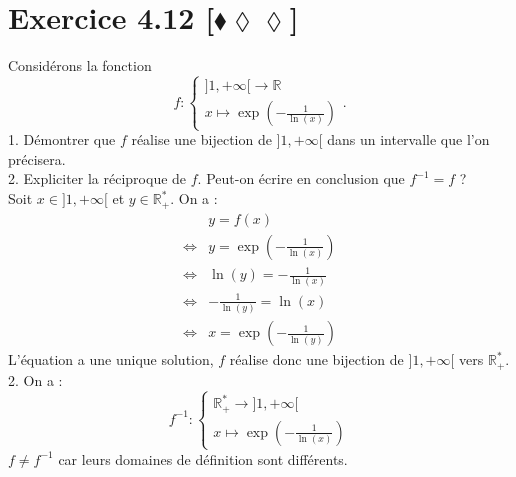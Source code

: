 \documentclass[10pt]{article}
\begin{document}
\section*{Exercice 4.12 [$\blacklozenge\lozenge\lozenge$]}
\begin{tcolorbox}[enhanced, width=7in, center, size=fbox, fontupper=\large, drop shadow southwest]
    Considérons la fonction
    \begin{equation*}
        f:\begin{cases}\rbrack1,+\infty\lbrack\rightarrow\mathbb{R}\\x\mapsto\exp(-\frac{1}{\ln(x)})\end{cases}.
    \end{equation*}
    1. Démontrer que $f$ réalise une bijection de $\rbrack1,+\infty\lbrack$ dans un intervalle que l'on précisera.\\
    2. Expliciter la réciproque de $f$. Peut-on écrire en conclusion que $f^{-1}=f$ ?\\[0.25cm]
    Soit $x\in\rbrack1,+\infty\lbrack$ et $y\in\mathbb{R}^*_+$. On a :
    \begin{align*}
        &y=f(x)\\
        \iff& y=\exp(-\frac{1}{\ln(x)})\\
        \iff& \ln(y)=-\frac{1}{\ln(x)}\\
        \iff& -\frac{1}{\ln(y)}=\ln(x)\\
        \iff& x=\exp(-\frac{1}{\ln(y)})
    \end{align*}
    L'équation a une unique solution, $f$ réalise donc une bijection de $\rbrack1,+\infty\lbrack$ vers $\mathbb{R}^*_+$.\\
    2. On a :
    \begin{equation*}
        f^{-1}:\begin{cases}\mathbb{R}^*_+\rightarrow\rbrack1,+\infty\lbrack\\x\mapsto\exp(-\frac{1}{\ln(x)})\end{cases}
    \end{equation*}
    $f\neq f^{-1}$ car leurs domaines de définition sont différents.
\end{tcolorbox}
\end{document}
